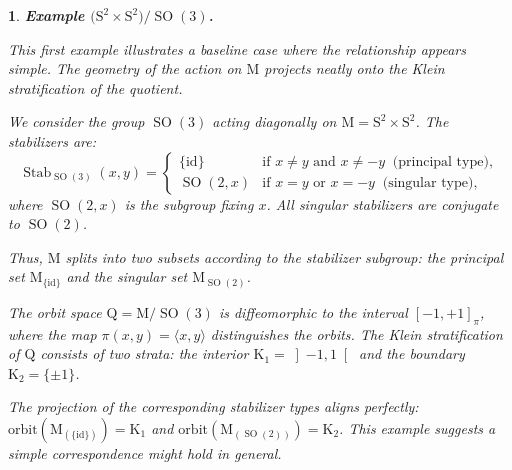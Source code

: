 \documentclass[10pt,reqno,letterpaper,twoside]{amsart}
\theoremstyle{article}
\newtheorem{article}{}
\def\artlabel[#1]{\textbf{#1.}}
\def \K{\mathrm K}
\def \M{\mathrm M}
\def \Q{\mathrm Q}
\def \S{\mathrm S}
\DeclareMathOperator{\SO}{SO}
\DeclareMathOperator{\Stab}{Stab}
\newcommand{\orbit}{{\mathrm{orbit}}}
\newcommand{\scal}[2]{\langle #1,#2\rangle}
\begin{document}
  
  \begin{article}
    \artlabel[Example $\pmb{(\S^2 \times \S^2) / \SO(3)}$]
    \label{ExampleS2SO3}
    
    This first example illustrates a baseline case where the relationship appears simple.
    The geometry of the action on $\M$ projects neatly onto the Klein stratification of the quotient.
    
    We consider the group $\SO(3)$ acting diagonally on $\M = \S^2\times \S^2$. The stabilizers are:
    $$
      \Stab_{\SO(3)}(x,y)=
      \begin{cases}
      \{\mathrm{id}\} & \text{if } x\neq y \text{ and } x\neq -y \ \text{ (principal type)}, \\
      \SO(2,x) & \text{if } x=y \text{ or } x=-y \ \text{ (singular type)},
      \end{cases}
      $$
    where $\SO(2,x)$ is the subgroup fixing $x$.
    All singular stabilizers are conjugate to $\SO(2)$.
    
    Thus,
    $\M$ splits into two subsets according to the stabilizer subgroup:
    the principal set $\M_{\{\mathrm{id}\}}$
    and the singular set $\M_{\SO(2)}$.
    
    The orbit space $\Q = \M / \SO(3)$ is diffeomorphic to the interval $[-1,+1]_\pi$,
    where the map $\pi(x,y) = \scal{x}{y}$ distinguishes the orbits.
    The Klein stratification of $\Q$ consists of two strata:
    the interior $\K_1 = \left]-1,1\right[$ and the boundary $\K_2 = \{\pm 1\}$.
    
    The projection of the corresponding stabilizer types aligns perfectly:
    $\orbit(\M_{(\{\mathrm{id}\})}) = \K_1$ and $\orbit(\M_{(\SO(2))}) = \K_2$.
    This example suggests a simple correspondence might hold in general.
    
    
  \end{article}
  
  
\end{document}
